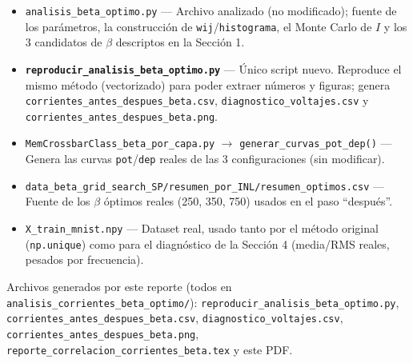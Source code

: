 \documentclass[11pt]{article}
\begin{document}
\begin{itemize}
\item \texttt{analisis\_beta\_optimo.py} --- Archivo analizado (no
  modificado); fuente de los parámetros, la construcción de
  \texttt{wij}/\texttt{histograma}, el Monte Carlo de $I$ y los 3
  candidatos de $\beta$ descriptos en la Sección 1.
\item \textbf{\texttt{reproducir\_analisis\_beta\_optimo.py}} --- Único
  script nuevo. Reproduce el mismo método (vectorizado) para poder
  extraer números y figuras; genera
  \texttt{corrientes\_antes\_despues\_beta.csv},
  \texttt{diagnostico\_voltajes.csv} y
  \texttt{corrientes\_antes\_despues\_beta.png}.
\item \texttt{MemCrossbarClass\_beta\_por\_capa.py}
  $\to$ \texttt{generar\_curvas\_pot\_dep()} --- Genera las curvas
  \texttt{pot}/\texttt{dep} reales de las 3 configuraciones (sin
  modificar).
\item \texttt{data\_beta\_grid\_search\_SP/resumen\_por\_INL/resumen\_optimos.csv}
  --- Fuente de los $\beta$ óptimos reales (250, 350, 750) usados en el
  paso ``después''.
\item \texttt{X\_train\_mnist.npy} --- Dataset real, usado tanto por el
  método original (\texttt{np.unique}) como para el diagnóstico de la
  Sección 4 (media/RMS reales, pesados por frecuencia).
\end{itemize}

Archivos generados por este reporte (todos en
\texttt{analisis\_corrientes\_beta\_optimo/}):
\texttt{reproducir\_analisis\_beta\_optimo.py},
\texttt{corrientes\_antes\_despues\_beta.csv},
\texttt{diagnostico\_voltajes.csv},
\texttt{corrientes\_antes\_despues\_beta.png},
\texttt{reporte\_correlacion\_corrientes\_beta.tex} y este PDF.
\end{document}

